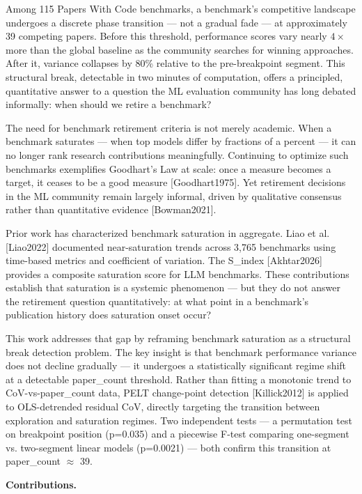 
Among 115 Papers With Code benchmarks, a benchmark's competitive landscape undergoes a discrete phase transition --- not a gradual fade --- at approximately 39 competing papers. Before this threshold, performance scores vary nearly $4\times$ more than the global baseline as the community searches for winning approaches. After it, variance collapses by 80\% relative to the pre-breakpoint segment. This structural break, detectable in two minutes of computation, offers a principled, quantitative answer to a question the ML evaluation community has long debated informally: when should we retire a benchmark?

The need for benchmark retirement criteria is not merely academic. When a benchmark saturates --- when top models differ by fractions of a percent --- it can no longer rank research contributions meaningfully. Continuing to optimize such benchmarks exemplifies Goodhart's Law at scale: once a measure becomes a target, it ceases to be a good measure [Goodhart1975]. Yet retirement decisions in the ML community remain largely informal, driven by qualitative consensus rather than quantitative evidence [Bowman2021].

Prior work has characterized benchmark saturation in aggregate. Liao et al. [Liao2022] documented near-saturation trends across 3,765 benchmarks using time-based metrics and coefficient of variation. The S\_index [Akhtar2026] provides a composite saturation score for LLM benchmarks. These contributions establish that saturation is a systemic phenomenon --- but they do not answer the retirement question quantitatively: at what point in a benchmark's publication history does saturation onset occur?

This work addresses that gap by reframing benchmark saturation as a structural break detection problem. The key insight is that benchmark performance variance does not decline gradually --- it undergoes a statistically significant regime shift at a detectable paper\_count threshold. Rather than fitting a monotonic trend to CoV-vs-paper\_count data, PELT change-point detection [Killick2012] is applied to OLS-detrended residual CoV, directly targeting the transition between exploration and saturation regimes. Two independent tests --- a permutation test on breakpoint position (p=0.035) and a piecewise F-test comparing one-segment vs. two-segment linear models (p=0.0021) --- both confirm this transition at paper\_count\* $\approx$ 39.

\textbf{Contributions.}

